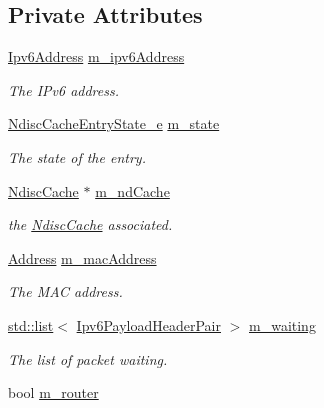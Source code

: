 \subsection*{Private Attributes}
\begin{DoxyCompactItemize}
\item 
\hyperlink{classns3_1_1Ipv6Address}{Ipv6\+Address} \hyperlink{classns3_1_1NdiscCache_1_1Entry_a3898a5f2de13afc888a20af7f10908a4}{m\+\_\+ipv6\+Address}
\begin{DoxyCompactList}\small\item\em The I\+Pv6 address. \end{DoxyCompactList}\item 
\hyperlink{classns3_1_1NdiscCache_1_1Entry_a18d0994b494f15432f9e02da84c69def}{Ndisc\+Cache\+Entry\+State\+\_\+e} \hyperlink{classns3_1_1NdiscCache_1_1Entry_a0f23b2879c9ba4228b48eed507bbe8f8}{m\+\_\+state}
\begin{DoxyCompactList}\small\item\em The state of the entry. \end{DoxyCompactList}\item 
\hyperlink{classns3_1_1NdiscCache}{Ndisc\+Cache} $\ast$ \hyperlink{classns3_1_1NdiscCache_1_1Entry_ac14c0e838e7dd19bf202c203818d9469}{m\+\_\+nd\+Cache}
\begin{DoxyCompactList}\small\item\em the \hyperlink{classns3_1_1NdiscCache}{Ndisc\+Cache} associated. \end{DoxyCompactList}\item 
\hyperlink{classns3_1_1Address}{Address} \hyperlink{classns3_1_1NdiscCache_1_1Entry_a92aa02032652e585a02afe587d1eba9d}{m\+\_\+mac\+Address}
\begin{DoxyCompactList}\small\item\em The M\+AC address. \end{DoxyCompactList}\item 
\hyperlink{openflow-interface_8h_afd9bcfa176617760671b67580f536fa7}{std\+::list}$<$ \hyperlink{classns3_1_1NdiscCache_a29c07f4c9da0e923f442f6440666240e}{Ipv6\+Payload\+Header\+Pair} $>$ \hyperlink{classns3_1_1NdiscCache_1_1Entry_a642bd20675037036b61a8dcf23cecf5b}{m\+\_\+waiting}
\begin{DoxyCompactList}\small\item\em The list of packet waiting. \end{DoxyCompactList}\item 
bool \hyperlink{classns3_1_1NdiscCache_1_1Entry_a04bd22fcb77caf25e535ae0f92cbac8f}{m\+\_\+router}

\end{DoxyCompactItemize}
